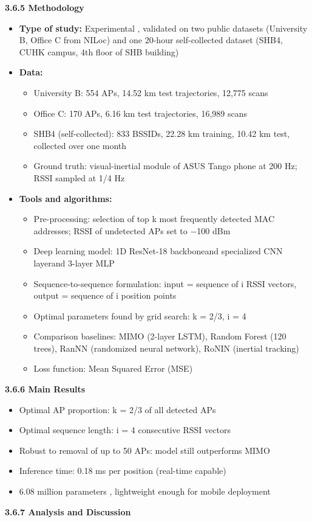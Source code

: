 \documentclass{ipgpmaster}
\begin{document}
\textbf{3.6.5 Methodology}

\begin{itemize}
    \item \textbf{Type of study:} Experimental ,  validated on two public datasets (University B, Office C from NILoc) and one 20-hour self-collected dataset (SHB4, CUHK campus, 4th floor of SHB building)
    \item \textbf{Data:} 
    \begin{itemize}
        \item University B: 554 APs, 14.52 km test trajectories, 12,775 scans
        \item Office C: 170 APs, 6.16 km test trajectories, 16,989 scans
        \item SHB4 (self-collected): 833 BSSIDs, 22.28 km training, 10.42 km test, collected over one month
        \item Ground truth: visual-inertial module of ASUS Tango phone at 200 Hz; RSSI sampled at 1/4 Hz
    \end{itemize}
    \item \textbf{Tools and algorithms:} 
    \begin{itemize}
        \item Pre-processing: selection of top k most frequently detected MAC addresses; RSSI of undetected APs set to −100 dBm
        \item Deep learning model: 1D ResNet-18 backboneand  specialized CNN layerand  3-layer MLP
        \item Sequence-to-sequence formulation: input = sequence of i RSSI vectors,  output = sequence of i position points
        \item Optimal parameters found by grid search: k = 2/3, i = 4
        \item Comparison baselines: MIMO (2-layer LSTM), Random Forest (120 trees), RanNN (randomized neural network), RoNIN (inertial tracking)
        \item Loss function: Mean Squared Error (MSE)


    \end{itemize}
\end{itemize}
\textbf{3.6.6 Main Results}

\begin{table}
\centering

\end{table}

\begin{itemize}
    \item Optimal AP proportion: k = 2/3 of all detected APs
    \item Optimal sequence length: i = 4 consecutive RSSI vectors
    \item Robust to removal of up to 50 APs: model still outperforms MIMO
    \item Inference time: 0.18 ms per position (real-time capable)
    \item 6.08 million parameters ,  lightweight enough for mobile deployment


\end{itemize}
\textbf{3.6.7 Analysis and Discussion}
\end{document}

